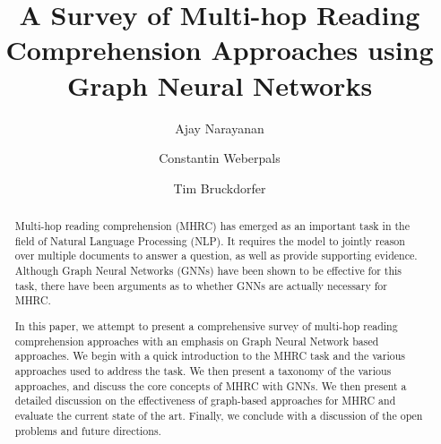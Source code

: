 \documentclass[sigplan,screen,nonacm]{acmart}
\begin{document}
\title{A Survey of Multi-hop Reading Comprehension Approaches using Graph Neural Networks}

\author{Ajay Narayanan}

\author{Constantin Weberpals}

\author{Tim Bruckdorfer}



\begin{abstract}
  Multi-hop reading comprehension (MHRC)  has emerged as an important task in the field of Natural Language Processing (NLP). It requires the model to 
  jointly reason over multiple documents to answer a question, as well as provide supporting evidence. Although Graph Neural Networks (GNNs) 
  have been shown to be effective for this task, there have been arguments as to whether GNNs are actually necessary for MHRC.

  In this paper, we attempt to present a comprehensive survey of multi-hop reading comprehension approaches with an emphasis on 
  Graph Neural Network based approaches. We begin with a quick introduction to the MHRC task and the various approaches used to address
  the task. We then present a taxonomy of the various approaches, and discuss the core concepts of MHRC with GNNs. We then present a detailed 
  discussion on the effectiveness of graph-based approaches for MHRC and evaluate the current state of the art. Finally, we conclude with a 
  discussion of the open problems and future directions.
\end{abstract}

\maketitle
\end{document}
